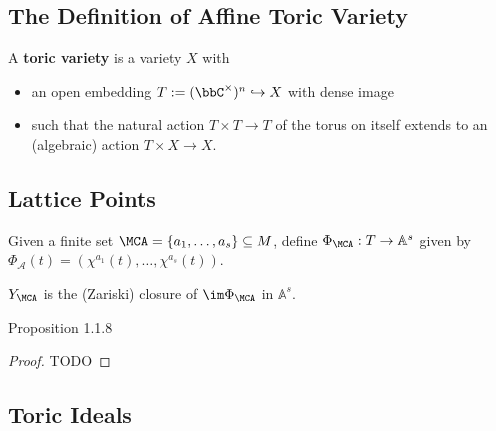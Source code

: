 \subsection{The Definition of Affine Toric Variety}


\begin{definition}
  \label{1-1-3-aff-tor-var}
  \leanok

  A {\bf toric variety} is a variety $X$ with
  \begin{itemize}
    \item an open embedding $T := (\bbC^\times)^n \hookrightarrow X$ with dense image
    \item such that the natural action $T \times T \to T$ of the torus on itself extends to an (algebraic) action $T \times X \to X$.
  \end{itemize}
\end{definition}


\subsection{Lattice Points}


\begin{definition}
  \label{1-1-phiA}

  Given a finite set $\MCA = \{a_1, \dotsc, a_s\} \subseteq M$, define $\Phi_\MCA : T \to \mathbb{A}^s$ given by $\Phi_{\mathcal A} (t) = (\chi^{a_1} (t), \dotsc, \chi^{a_s} (t))$.
\end{definition}


\begin{definition}
  \label{1-1-7-ya}

  $Y_\MCA$ is the (Zariski) closure of $\im \Phi_\MCA$ in $\mathbb A^s$.
\end{definition}


\begin{proposition}
  \label{1-1-8-aff-tor-var-ya}

  Proposition 1.1.8
\end{proposition}
\begin{proof}

  TODO
\end{proof}


\subsection{Toric Ideals}


